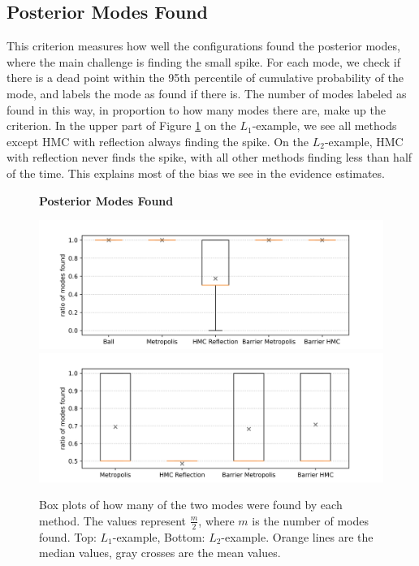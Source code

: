 \documentclass[12pt, a4paper]{report}
\begin{document}
\subsection{Posterior Modes Found}
This criterion measures how well the configurations found the posterior modes, where the main challenge is finding the small spike.
For each mode, we check if there is a dead point within the 95th percentile of cumulative probability of the mode, and labels the mode as found if there is.
The number of modes labeled as found in this way, in proportion to how many modes there are, make up the criterion.
In the upper part of Figure \ref{fig:results_modes_found} on the $L_1$-example, we see all methods except HMC with reflection always finding the spike.
On the $L_2$-example, HMC with reflection never finds the spike, with all other methods finding less than half of the time.
This explains most of the bias we see in the evidence estimates.
\begin{figure}
    \centering
    {\small \textbf{Posterior Modes Found} \par}
    \includegraphics[scale=0.7]{figs/results/modes_found_spike_20d.png}
    \includegraphics[scale=0.7]{figs/results/modes_found_spike_offcenter_20d.png}
    \caption{Box plots of how many of the two modes were found by each method. The values represent $\frac{m}{2}$, where $m$ is the number of modes found. Top: $L_1$-example, Bottom: $L_2$-example. Orange lines are the median values, gray crosses are the mean values.}
    \label{fig:results_modes_found}
\end{figure}
\end{document}
